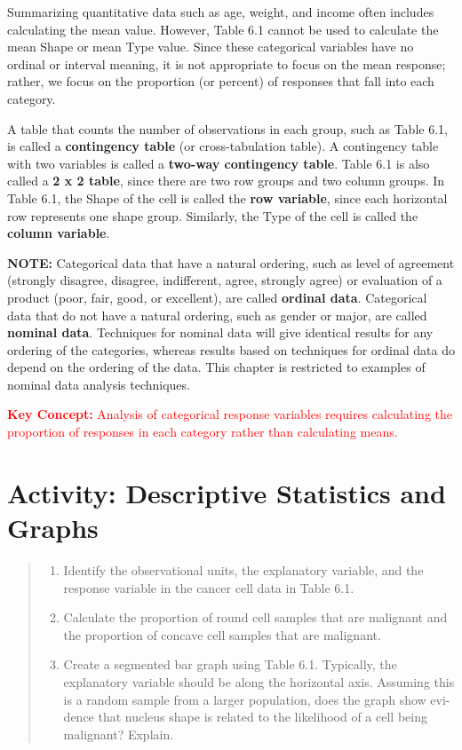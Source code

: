 \documentclass[
]{report}
\providecommand{\tightlist}{%
  \setlength{\itemsep}{0pt}\setlength{\parskip}{0pt}}
\begin{document}
Summarizing quantitative data such as age, weight, and income often includes calculating the mean value.
However, Table 6.1 cannot be used to calculate the mean Shape or mean Type value. Since these categorical
variables have no ordinal or interval meaning, it is not appropriate to focus on the mean response; rather, we
focus on the proportion (or percent) of responses that fall into each category.

A table that counts the number of observations in each group, such as Table 6.1, is called a \textbf{contingency table} (or cross-tabulation table). A contingency table with two variables is called a \textbf{two-way contingency table}. Table 6.1 is also called a \textbf{2 x 2 table}, since there are two row groups and two column groups. In Table
6.1, the Shape of the cell is called the \textbf{row variable}, since each horizontal row represents one shape group.
Similarly, the Type of the cell is called the \textbf{column variable}.

\large

\textbf{NOTE:}
Categorical data that have a natural ordering, such as level of agreement (strongly disagree, disagree,
indifferent, agree, strongly agree) or evaluation of a product (poor, fair, good, or excellent), are called
\textbf{ordinal data}. Categorical data that do not have a natural ordering, such as gender or major, are called
\textbf{nominal data}. Techniques for nominal data will give identical results for any ordering of the categories,
whereas results based on techniques for ordinal data do depend on the ordering of the data. This chapter
is restricted to examples of nominal data analysis techniques.
\normalsize

\Large

\textbf{\textcolor{red}{Key Concept:}}
\textcolor{red}{Analysis of categorical response variables requires calculating the proportion of responses in each
category rather than calculating means.}
\normalsize

\chapter{Activity: Descriptive Statistics and Graphs}\label{activity-descriptive-statistics-and-graphs}

\begin{quote}
\begin{enumerate}
\def\labelenumi{\arabic{enumi}.}
\tightlist
\item
  Identify the observational units, the explanatory variable, and the response variable in the cancer cell
  data in Table 6.1.
\item
  Calculate the proportion of round cell samples that are malignant and the proportion of concave cell
  samples that are malignant.
\item
  Create a segmented bar graph using Table 6.1. Typically, the explanatory variable should be along the
  horizontal axis. Assuming this is a random sample from a larger population, does the graph show evi-
  dence that nucleus shape is related to the likelihood of a cell being malignant? Explain.
\end{enumerate}
\end{quote}
\end{document}
